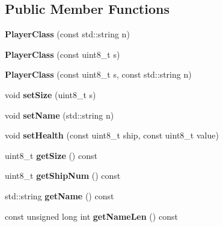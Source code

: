 \subsection*{Public Member Functions}
\begin{DoxyCompactItemize}
\item 
\mbox{\label{class_player_class_a0db0cefe143eeea2e4861af370be63d8}} 
{\bfseries Player\+Class} (const std\+::string n)
\item 
\mbox{\label{class_player_class_a517fb3c542ad872414d330fd8b2d2115}} 
{\bfseries Player\+Class} (const uint8\+\_\+t s)
\item 
\mbox{\label{class_player_class_a54a5c2175c63d78c799fe28779f384ee}} 
{\bfseries Player\+Class} (const uint8\+\_\+t s, const std\+::string n)
\item 
\mbox{\label{class_player_class_ac2fe3cd6653da37eae60e888c79f3a15}} 
void {\bfseries set\+Size} (uint8\+\_\+t s)
\item 
\mbox{\label{class_player_class_a4794a1ce7a3778492a105825636a63eb}} 
void {\bfseries set\+Name} (std\+::string n)
\item 
\mbox{\label{class_player_class_ac94c0f0dc9c72be7496587f7626ccead}} 
void {\bfseries set\+Health} (const uint8\+\_\+t ship, const uint8\+\_\+t value)
\item 
\mbox{\label{class_player_class_afa4f22907dc8c45703a4df9c914cccea}} 
uint8\+\_\+t {\bfseries get\+Size} () const
\item 
\mbox{\label{class_player_class_ac165d8152364b3d27e2ac2c940197bea}} 
uint8\+\_\+t {\bfseries get\+Ship\+Num} () const
\item 
\mbox{\label{class_player_class_a896115c19c6fb09172afac43cb8c4eea}} 
std\+::string {\bfseries get\+Name} () const
\item 
\mbox{\label{class_player_class_ad779ff20e6557c05130b6b29974bc3b5}} 
const unsigned long int {\bfseries get\+Name\+Len} () const

\end{DoxyCompactItemize}
